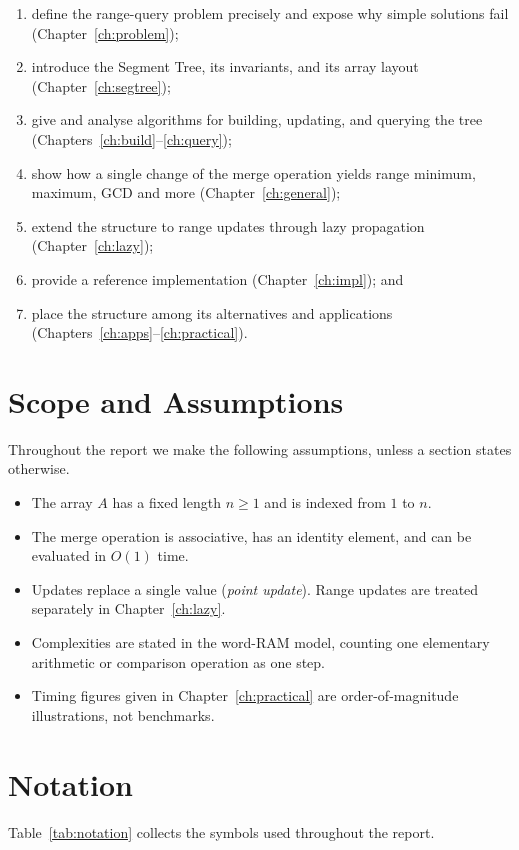 \documentclass[
  11pt,
  a4paper,
  twoside=false,
  numbers=noenddot,
  headings=big,
  parskip=half,
  toc=bibliography,
  toc=listof,
  bibliography=totoc
]{scrreprt}
\begin{document}
\begin{enumerate}[nosep]
  \item define the range-query problem precisely and expose why simple solutions fail (Chapter~\ref{ch:problem});
  \item introduce the Segment Tree, its invariants, and its array layout (Chapter~\ref{ch:segtree});
  \item give and analyse algorithms for building, updating, and querying the tree (Chapters~\ref{ch:build}--\ref{ch:query});
  \item show how a single change of the merge operation yields range minimum, maximum, GCD and more (Chapter~\ref{ch:general});
  \item extend the structure to range updates through lazy propagation (Chapter~\ref{ch:lazy});
  \item provide a reference implementation (Chapter~\ref{ch:impl}); and
  \item place the structure among its alternatives and applications (Chapters~\ref{ch:apps}--\ref{ch:practical}).
\end{enumerate}

\section{Scope and Assumptions}
Throughout the report we make the following assumptions, unless a section states otherwise.

\begin{itemize}[nosep]
  \item The array $A$ has a fixed length $n \ge 1$ and is indexed from $1$ to $n$.
  \item The merge operation is associative, has an identity element, and can be evaluated in $O(1)$ time.
  \item Updates replace a single value (\emph{point update}). Range updates are treated separately in Chapter~\ref{ch:lazy}.
  \item Complexities are stated in the word-RAM model, counting one elementary arithmetic or comparison operation as one step.
  \item Timing figures given in Chapter~\ref{ch:practical} are order-of-magnitude illustrations, not benchmarks.
\end{itemize}

\section{Notation}
Table~\ref{tab:notation} collects the symbols used throughout the report.
\end{document}
